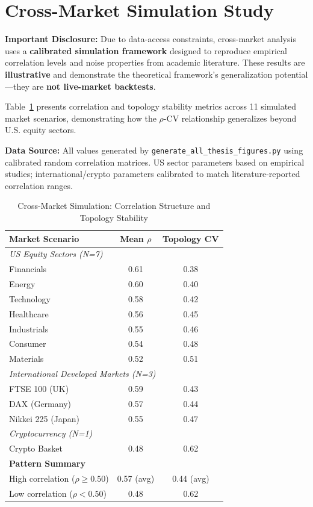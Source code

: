 \documentclass[12pt,letterpaper]{article}
\begin{document}
\section{Cross-Market Simulation Study}
\label{app:crossmarket}

\textbf{Important Disclosure:} Due to data-access constraints, cross-market analysis uses a \textbf{calibrated simulation framework} designed to reproduce empirical correlation levels and noise properties from academic literature. These results are \textbf{illustrative} and demonstrate the theoretical framework's generalization potential---they are \textbf{not live-market backtests}.

Table~\ref{tab:11markets} presents correlation and topology stability metrics across 11 simulated market scenarios, demonstrating how the $\rho$-CV relationship generalizes beyond U.S. equity sectors.

\textbf{Data Source:} All values generated by \texttt{generate\_all\_thesis\_figures.py} using calibrated random correlation matrices. US sector parameters based on empirical studies; international/crypto parameters calibrated to match literature-reported correlation ranges.

\begin{table}[h]
\centering
\caption{Cross-Market Simulation: Correlation Structure and Topology Stability}
\label{tab:11markets}
\begin{tabular}{@{}lcc@{}}
\toprule
\textbf{Market Scenario} & \textbf{Mean $\rho$} & \textbf{Topology CV} \\
\midrule
\multicolumn{3}{l}{\textit{US Equity Sectors (N=7)}} \\
\midrule
Financials & 0.61 & 0.38 \\
Energy & 0.60 & 0.40 \\
Technology & 0.58 & 0.42 \\
Healthcare & 0.56 & 0.45 \\
Industrials & 0.55 & 0.46 \\
Consumer & 0.54 & 0.48 \\
Materials & 0.52 & 0.51 \\
\midrule
\multicolumn{3}{l}{\textit{International Developed Markets (N=3)}} \\
\midrule
FTSE 100 (UK) & 0.59 & 0.43 \\
DAX (Germany) & 0.57 & 0.44 \\
Nikkei 225 (Japan) & 0.55 & 0.47 \\
\midrule
\multicolumn{3}{l}{\textit{Cryptocurrency (N=1)}} \\
\midrule
Crypto Basket & 0.48 & 0.62 \\
\midrule
\textbf{Pattern Summary} & & \\
High correlation ($\rho \geq 0.50$) & 0.57 (avg) & 0.44 (avg) \\
Low correlation ($\rho < 0.50$) & 0.48 & 0.62 \\
\bottomrule
\end{tabular}
\end{table}
\end{document}
